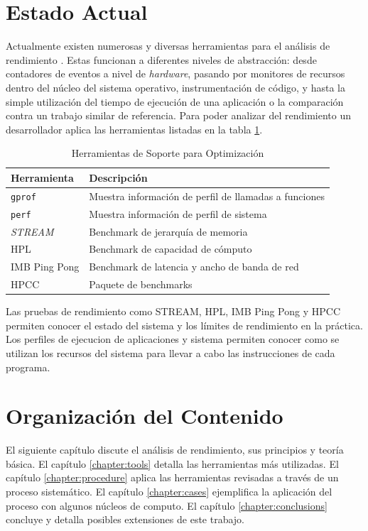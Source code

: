 \documentclass[a4paper]{report}
\begin{document}
\section{Estado Actual}

Actualmente existen numerosas y diversas herramientas para el análisis de rendimiento \cite{gregg}.
Estas funcionan a diferentes niveles de abstracción: desde contadores de eventos
a nivel de {\it hardware}, pasando por monitores de recursos dentro del núcleo del sistema operativo, instrumentación de código, y hasta la simple utilización del tiempo de ejecución de una aplicación o la comparación contra un trabajo similar de referencia.
Para poder analizar del rendimiento un desarrollador aplica las herramientas listadas en la tabla \ref{table:tools}.

\begin{table}[H]
    \caption{Herramientas de Soporte para Optimización}
    \centering
    \begin{tabular}{|l|l|}\hline
      {\bf Herramienta} & {\bf Descripción} \\ \hline
      {\tt gprof} & Muestra información de perfil de llamadas a funciones \\ \hline
      {\tt perf} & Muestra información de perfil de sistema \\ \hline
      {\it STREAM} & Benchmark de jerarquía de memoria \\ \hline
      HPL & Benchmark de capacidad de cómputo \\ \hline
      IMB Ping Pong & Benchmark de latencia y ancho de banda de red \\ \hline
      HPCC & Paquete de benchmarks \\ \hline
    \end{tabular}
    \label{table:tools}
\end{table}

Las pruebas de rendimiento como STREAM, HPL, IMB Ping Pong y HPCC permiten conocer el estado del sistema y los límites de rendimiento en la práctica.
Los perfiles de ejecucion de aplicaciones y sistema permiten conocer como se utilizan los recursos del sistema para llevar a cabo las instrucciones de cada programa.

\section{Organización del Contenido}

El siguiente capítulo discute el análisis de rendimiento, sus
principios y teoría básica. El capítulo \ref{chapter:tools} detalla las herramientas más
utilizadas. El capítulo \ref{chapter:procedure} aplica las herramientas revisadas a través de un proceso sistemático. El capítulo \ref{chapter:cases} ejemplifica la aplicación del proceso con algunos núcleos de computo. El capítulo \ref{chapter:conclusions} concluye y detalla posibles extensiones de este trabajo.
\end{document}
